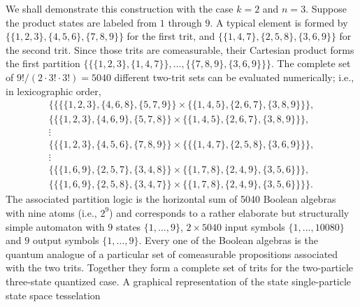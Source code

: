 \documentclass{llncs}
\begin{document}
We shall demonstrate this construction with the case $k=2$ and $n=3$.
Suppose the product states are labeled from $1$ through $9$.
A typical element is formed by
$\{\{1,2,3\},\{4,5,6\},\{7,8,9\}\}$ for the first trit, and
$\{\{1,4,7\},\{2,5,8\},\{3,6,9\}\}$ for the second trit. Since those trits are comeasurable,
their Cartesian product forms the first partition
$
\{
\{\{1,2,3\},\{1,4,7\}\},\ldots ,\{\{7,8,9\},\{3,6,9\}\}
\}
$.
The complete set of $9!/(2\cdot 3!\cdot 3!)= 5040$
different two-trit sets can be evaluated numerically; i.e.,
in lexicographic order,
%
%
%
\begin{eqnarray}
&\{\{\{\{1, 2, 3\}, \{4, 6, 8\}, \{5, 7, 9\}\}\times \{\{1, 4, 5\}, \{2, 6, 7\}, \{3, 8, 9\}\}\},  &\label{2002-kyoto-lb}    \\
&\{\{\{1, 2, 3\}, \{4, 6, 9\}, \{5, 7, 8\}\}\times \{\{1, 4, 5\}, \{2, 6, 7\}, \{3, 8, 9\}\}\},  &\\
&\vdots         \nonumber                                                             &             \\
&\{\{\{1,2,3\},\{4,5,6\},\{7,8,9\}\}\times \{\{\{1,4,7\},\{2,5,8\},\{3,6,9\}\}\} ,                  &     \\
&\vdots         \nonumber                                                             &              \\
&\{\{\{1, 6,   9\}, \{2, 5, 7\}, \{3, 4, 8\}\}\times \{ \{1, 7, 8\}, \{2, 4, 9\}, \{3, 5, 6\}\}\},  &    \\
&\{\{\{1, 6,   9\}, \{2, 5, 8\}, \{3, 4, 7\}\}\times \{ \{1, 7, 8\}, \{2, 4, 9\}, \{3, 5, 6\}\}\}\}.& \label{2002-kyoto-lf}
\end{eqnarray}
The associated partition logic is the horizontal sum of 5040
Boolean algebras with nine atoms (i.e., $2^9$) and corresponds to a rather
elaborate but structurally simple automaton with $9$ states $\{1,\ldots ,9\}$, $2\times 5040$ input symbols
$\{1,\ldots ,10080\}$ and $9$ output symbols $\{1,\ldots ,9\}$.
Every one of the Boolean algebras is the quantum analogue of a particular set of comeasurable
propositions associated with the two trits.
Together they form a complete set of trits for the two-particle three-state quantized case.
A graphical representation of the state single-particle state space tesselation
\end{document}
